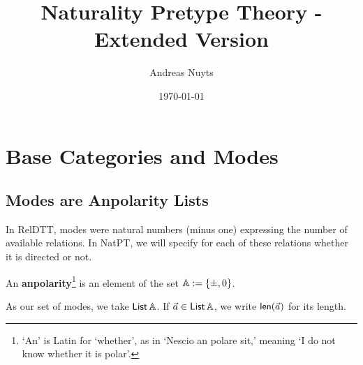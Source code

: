 \documentclass[a4paper]{article}
\newcommand{\thetitle}{Naturality Pretype Theory - Extended Version}
\newcommand{\theauthors}{Andreas Nuyts}
\begin{document}
	\addtolength{\voffset}{-.5in}

\title{\thetitle}
\date{\today}
\author{\theauthors{}}
\maketitle

\tableofcontents

\pagebreak

\section{Base Categories and Modes}

\subsection{Modes are Anpolarity Lists}
In RelDTT, modes were natural numbers (minus one) expressing the number of available relations.
In NatPT, we will specify for each of these relations whether it is directed or not.
\begin{definition} \label{def:anpolarity}
	An \textbf{anpolarity}\footnote{`An' is Latin for `whether', as in `Nescio an polare sit,' meaning `I do not know whether it is polar'.} is an element of the set ${\mathbb{A}} := \mathopen{}\left\{ {\pm}, 0 \right\}\mathclose{}$.
\end{definition}
\noindent As our set of modes, we take ${\mathsf{List}}\,{\mathbb{A}}$. If $\vec a \in {\mathsf{List}}\,{\mathbb{A}}$, we write $\mathsf{len}(\vec a)$ for its length.
\end{document}
